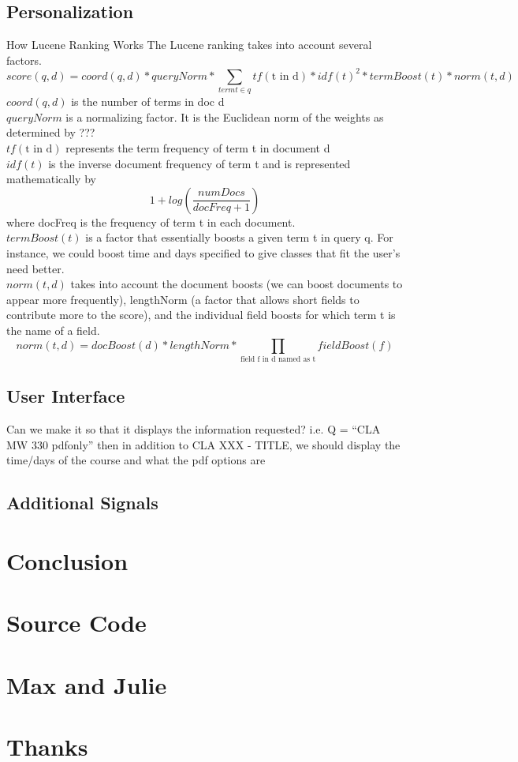 \documentclass[12pt,letterpaper]{article}
\begin{document}
\subsection{Personalization}
How Lucene Ranking Works
The Lucene ranking takes into account several factors. 
\begin{equation}
  score(q,d) = coord(q,d) * queryNorm * \sum_{term t \in q}{tf(\text{t in d}) * idf(t)^2 * termBoost(t) * norm(t,d)}
  \label{eq:practical}
\end{equation}
$coord(q,d)$ is the number of terms in doc d\\
$queryNorm$ is a normalizing factor. It is the Euclidean norm of the weights as determined by ???\\
$tf(\text{t in d})$ represents the term frequency of term t in document d \\
$idf(t)$ is the inverse document frequency of term t and is represented mathematically by \[ 1 + log(\frac{numDocs}{docFreq + 1}) \] where docFreq is the frequency of term t in each document. \\
$termBoost(t)$ is a factor that essentially boosts a given term t in query q. For instance, we could boost time and days specified to give classes that fit the user's need better.\\
$norm(t, d)$ takes into account the document boosts (we can boost documents to appear more frequently), lengthNorm (a factor that allows short fields to contribute more to the score), and the individual field boosts for which term t is the name of a field. 
\[ norm(t,d) = docBoost(d) * lengthNorm * \prod_{\text{field f in d named as t}}{fieldBoost(f)} \] 				
	
	
\subsection{User Interface}
Can we make it so that it displays the information requested? i.e. Q = ``CLA MW 330 pdfonly'' then in addition to CLA XXX - TITLE, we should display the time/days of the course and what the pdf options are
\subsection{Additional Signals}

\section{Conclusion}

\appendix

\section{Source Code}
\section{Max and Julie}
\section{Thanks}
\end{document}
